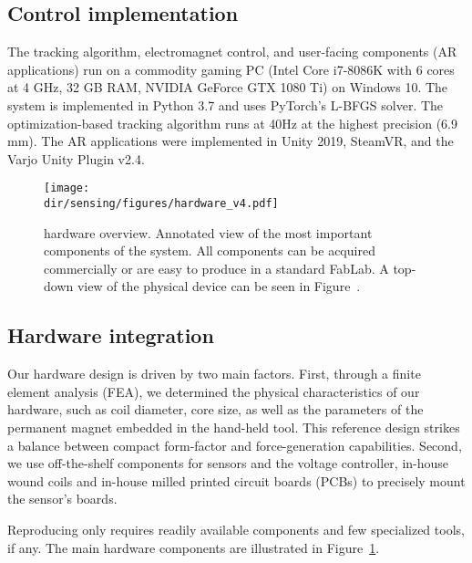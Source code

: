 \subsection{Control implementation}
The tracking algorithm, electromagnet control, and user-facing components (AR applications) run on a commodity gaming PC (Intel Core i7-8086K with 6 cores at 4 GHz, 32 GB RAM, NVIDIA GeForce GTX 1080 Ti) on Windows 10. The system is implemented in Python 3.7 and uses PyTorch's L-BFGS solver. The optimization-based tracking algorithm runs at 40Hz at the highest precision (6.9 mm). The AR applications were implemented in Unity 2019, SteamVR, and the Varjo Unity Plugin v2.4.
\begin{figure}[!t]
\centering
\texttt{[image: \\dir/sensing/figures/hardware\_v4.pdf]}
\caption{\omniUIST hardware overview. Annotated view of the most important components of the system. All components can be acquired commercially or are easy to produce in a standard FabLab.
A top-down view of the physical device can be seen in Figure~.}
\label{fig:control_Scheme}
\end{figure}

\subsection{Hardware integration}
Our hardware design is driven by two main factors. First, through a finite element analysis (FEA), we determined the physical characteristics of our hardware, such as coil diameter, core size, as well as the parameters of the permanent magnet embedded in the hand-held tool. This reference design strikes a balance between compact form-factor and force-generation capabilities. Second, we use off-the-shelf components for sensors and the voltage controller, in-house wound coils and in-house milled printed circuit boards (PCBs) to precisely mount the sensor's boards.

Reproducing \omniUIST only requires readily available components and few specialized tools, if any. The main hardware components are illustrated in Figure~\ref{fig:control_Scheme}.

